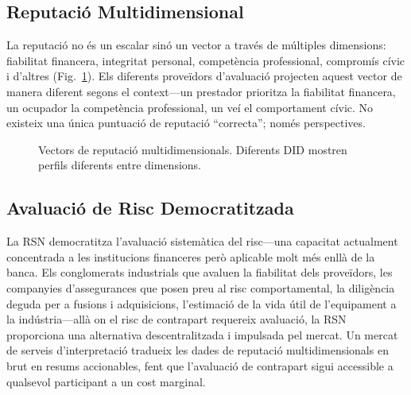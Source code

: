 \documentclass[11pt,a4paper,twocolumn]{article}
\begin{document}
\subsection{Reputació Multidimensional}

La reputació no és un escalar sinó un vector a través de múltiples dimensions: fiabilitat financera, integritat personal, competència professional, compromís cívic i d'altres (Fig.~\ref{fig:reputation-radar}). Els diferents proveïdors d'avaluació projecten aquest vector de manera diferent segons el context---un prestador prioritza la fiabilitat financera, un ocupador la competència professional, un veí el comportament cívic. No existeix una única puntuació de reputació ``correcta''; només perspectives.

\begin{figure}[ht]
\centering
{}
\caption{Vectors de reputació multidimensionals. Diferents DID mostren perfils diferents entre dimensions.}
\label{fig:reputation-radar}
\end{figure}

\subsection{Avaluació de Risc Democratitzada}

La RSN democratitza l'avaluació sistemàtica del risc---una capacitat actualment concentrada a les institucions financeres però aplicable molt més enllà de la banca. Els conglomerats industrials que avaluen la fiabilitat dels proveïdors, les companyies d'assegurances que posen preu al risc comportamental, la diligència deguda per a fusions i adquisicions, l'estimació de la vida útil de l'equipament a la indústria---allà on el risc de contrapart requereix avaluació, la RSN proporciona una alternativa descentralitzada i impulsada pel mercat. Un mercat de serveis d'interpretació tradueix les dades de reputació multidimensionals en brut en resums accionables, fent que l'avaluació de contrapart sigui accessible a qualsevol participant a un cost marginal.
\end{document}

